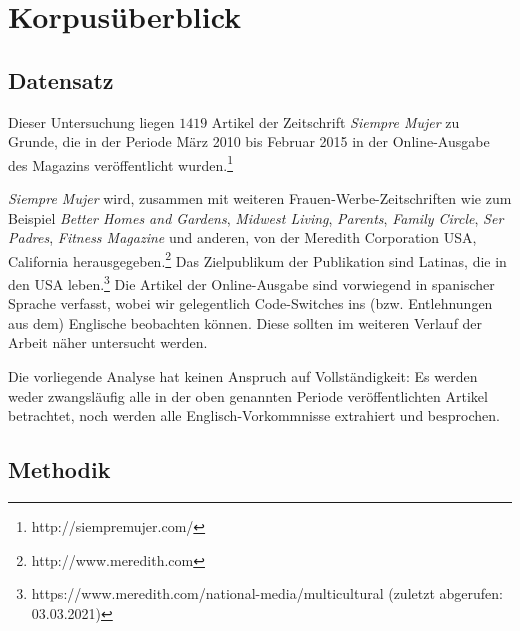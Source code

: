 \section{Korpusüberblick}
\label{chap:corpus}


\subsection{Datensatz}

Dieser Untersuchung liegen $1419$ Artikel der Zeitschrift \textit{Siempre Mujer} zu Grunde,
die in der Periode März 2010 bis Februar 2015 in der Online-Ausgabe des Magazins veröffentlicht wurden.\footnote{http://siempremujer.com/}

\textit{Siempre Mujer} wird, zusammen mit weiteren Frauen-Werbe-Zeitschriften wie zum Beispiel \textit{Better Homes and Gardens}, \textit{Midwest Living}, \textit{Parents}, \textit{Family Circle}, \textit{Ser Padres}, \textit{Fitness Magazine} und anderen, von der Meredith Corporation USA, California herausgegeben.\footnote{http://www.meredith.com}
Das Zielpublikum der Publikation sind Latinas, die in den USA leben.\footnote{https://www.meredith.com/national-media/multicultural (zuletzt abgerufen: 03.03.2021)}
Die Artikel der Online-Ausgabe sind vorwiegend in spanischer Sprache verfasst,
wobei wir gelegentlich Code-Switches ins (bzw. Entlehnungen aus dem) Englische beobachten können.
Diese sollten im weiteren Verlauf der Arbeit näher untersucht werden.

Die vorliegende Analyse hat keinen Anspruch auf Vollständigkeit:
Es werden weder zwangsläufig alle in der oben genannten Periode veröffentlichten Artikel betrachtet,
noch werden alle Englisch-Vorkommnisse extrahiert und besprochen.



\subsection{Methodik}

